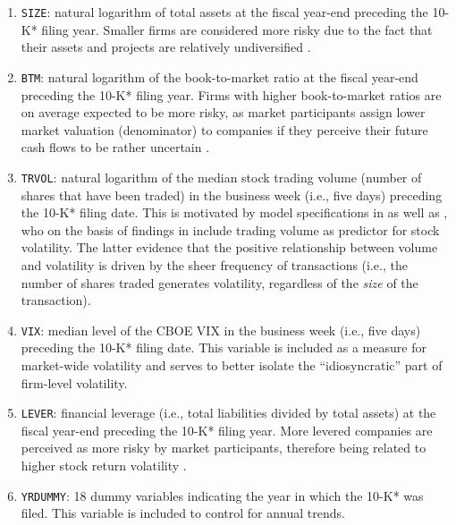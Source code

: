 \begin{enumerate}[(1)]

\item \texttt{SIZE}: natural logarithm of total assets at the fiscal year-end preceding the 10-K* filing year. Smaller firms are considered more risky due to the fact that their assets and projects are relatively undiversified \parencite{KothariLiShort_2009}. 

\item\texttt{BTM}: natural logarithm of the book-to-market ratio at the fiscal year-end preceding the 10-K* filing year. Firms with higher book-to-market ratios are on average expected to be more risky, as market participants assign lower market valuation (denominator) to companies if they perceive their future cash flows to be rather uncertain \parencite{KothariLiShort_2009}. 

\item \texttt{TRVOL}: natural logarithm of the median stock trading volume (number of shares that have been traded) in the business week (i.e., five days) preceding the 10-K* filing date. This is motivated by model specifications in \textcite{AntweilerFrank2004} as well as \textcite{Tetlock2007}, who on the basis of findings in \textcite{JonesKaulLipson_1994} include trading volume as predictor for stock volatility. The latter evidence that the positive relationship between volume and volatility is driven by the sheer frequency of transactions (i.e., the number of shares traded generates volatility, regardless of the \textit{size} of the transaction). 

\item \texttt{VIX}: median level of the CBOE VIX in the business week (i.e., five days) preceding the 10-K* filing date. This variable is included as a measure for market-wide volatility and serves to better isolate the \enquote{idiosyncratic} part of firm-level volatility. 

\item \texttt{LEVER}: financial leverage (i.e., total liabilities divided by total assets) at the fiscal year-end preceding the 10-K* filing year. More levered companies are perceived as more risky by market participants, therefore being related to higher stock return volatility \parencite{KothariLiShort_2009}.

\item \texttt{YRDUMMY}: 18 dummy variables indicating the year in which the 10-K* was filed. This variable is included to control for annual trends.


\end{enumerate}
